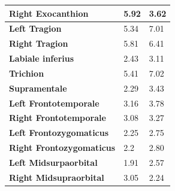 \begin{table}[!ht]
\begin{tabular}{|l|l|l|}
                \textbf{Right Exocanthion} & 5.92 & \cellcolor{green!25}3.62 \\ \hline
                \textbf{Left Tragion} & \cellcolor{green!25}5.34 & 7.01 \\ \hline
                \textbf{Right Tragion} & \cellcolor{green!25}5.81 & 6.41 \\ \hline
                \textbf{Labiale inferius} & \cellcolor{green!25}2.43 & 3.11 \\ \hline
                \textbf{Trichion} & \cellcolor{green!25}5.41 & 7.02 \\ \hline
                \textbf{Supramentale} & \cellcolor{green!25}2.29 & 3.43 \\ \hline
                \textbf{Left Frontotemporale} & \cellcolor{green!25}3.16 & 3.78 \\ \hline
                \textbf{Right Frontotemporale} & \cellcolor{green!25}3.08 & 3.27 \\ \hline
                \textbf{Left Frontozygomaticus} & \cellcolor{green!25}2.25 & 2.75 \\ \hline
                \textbf{Right Frontozygomaticus} & \cellcolor{green!25}2.2 & 2.80 \\ \hline
                \textbf{Left Midsurpaorbital} & \cellcolor{green!25}1.91 & 2.57 \\ \hline
                \textbf{Right Midsupraorbital} & 3.05 & \cellcolor{green!25}2.24 \\ \hline
            \end{tabular}
            \label{table:comparativa-Landmarks}
        \end{table}
\endinput




